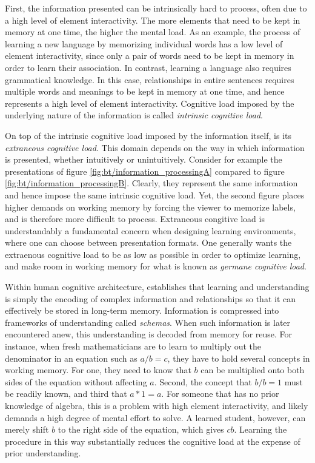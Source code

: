 First, the information presented can be intrinsically hard to process, often due to a high level of element interactivity. The more elements that need to be kept in memory at one time, the higher the mental load. As an example, the process of learning a new language by memorizing individual words has a low level of element interactivity, since only a pair of words need to be kept in memory in order to learn their association. In contrast, learning a language also requires grammatical knowledge. In this case, relationships in entire sentences requires multiple words and meanings to be kept in memory at one time, and hence represents a high level of element interactivity. Cognitive load imposed by the underlying nature of the information is called \textit{intrinsic cognitive load}.

On top of the intrinsic cognitive load imposed by the information itself, is its \textit{extraneous cognitive load}. This domain depends on the way in which information is presented, whether intuitively or unintuitively. Consider for example the presentations of figure \ref{fig:bt/information_processingA} compared to figure \ref{fig:bt/information_processingB}. Clearly, they represent the same information and hence impose the same intrinsic cognitive load. Yet, the second figure places higher demands on working memory by forcing the viewer to memorize labels, and is therefore more difficult to process. Extraneous congitive load is understandably a fundamental concern when designing learning environments, where one can choose between presentation formats. One generally wants the extraenous cognitive load to be as low as possible in order to optimize learning, and make room in working memory for what is known as \textit{germane cognitive load}.

Within human cognitive architecture, \textcite{sweller1988} establishes that learning and understanding is simply the encoding of complex information and relationships so that it can effectively be stored in long-term memory. Information is compressed into frameworks of understanding called \textit{schemas}. When such information is later encountered anew, this understanding is decoded from memory for reuse. For instance, when fresh mathematicians are to learn to multiply out the denominator in an equation such as $a/b=c$, they have to hold several concepts in working memory. For one, they need to know that $b$ can be multiplied onto both sides of the equation without affecting $a$. Second, the concept that $b/b=1$ must be readily known, and third that $a*1=a$. For someone that has no prior knowledge of algebra, this is a problem with high element interactivity, and likely demands a high degree of mental effort to solve. A learned student, however, can merely shift $b$ to the right side of the equation, which gives $cb$. Learning the procedure in this way substantially reduces the cognitive load at the expense of prior understanding.

